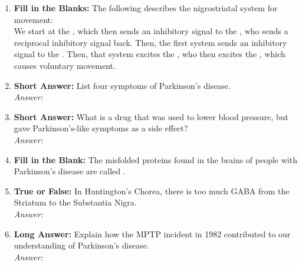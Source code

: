 \begin{enumerate}[label=\textbf{Q3.5.\arabic*}]
    \item \textbf{Fill in the Blanks:} The following describes the nigrostriatal system for movement: \\
    We start at the \underline{\hspace{3cm}}, which then sends an inhibitory \underline{\hspace{3cm}} signal to the \underline{\hspace{3cm}}, who sends a reciprocal inhibitory \underline{\hspace{3cm}} signal back. Then, the first system sends an inhibitory \underline{\hspace{3cm}} signal to the \underline{\hspace{3cm}}. Then, that system excites the \underline{\hspace{3cm}}, who then excites the \underline{\hspace{3cm}}, which causes voluntary movement.

    \item \textbf{Short Answer:} List four symptoms of Parkinson's disease. \\
        \textit{Answer:} \\%


    \item \textbf{Short Answer:} What is a drug that was used to lower blood pressure, but gave Parkinson's-like symptoms as a side effect? \\
        \textit{Answer:} \\%

    \item \textbf{Fill in the Blank:} The misfolded proteins found in the brains of people with Parkinson's disease are called \underline{\hspace{3cm}}.

    \item \textbf{True or False:} In Huntington's Chorea, there is too much GABA from the Striatum to the Substantia Nigra. \\
        \textit{Answer:} %

    \item \textbf{Long Answer:} Explain how the MPTP incident in 1982 contributed to our understanding of Parkinson's disease. \\
        \textit{Answer:} \\[2cm] %


\end{enumerate}
